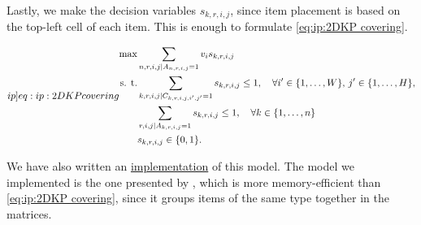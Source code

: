 Lastly, we make the decision variables $s_{k,r,i,j}$, since item placement is based on the top-left cell of each item. This is enough to formulate \cref{eq:ip:2DKP covering}.

\begin{subequations}
    \label[ip]{eq:ip:2DKP covering}
    \begin{align}
        \max &\sum_{n,r,i,j \mid A_{n,r,i,j} = 1} v_i s_{k,r,i,j}\\
        \text{s. t.} &\sum_{k,r,i,j \mid C_{k,r,i,j,i',j'} = 1} s_{k,r,i,j} \leq 1, \quad \forall i' \in \{1,\dots,W\}, \, j' \in \{1,\dots,H\},\\
        &\sum_{r,i,j \mid A_{k,r,i,j} = 1} s_{k,r,i,j} \leq 1, \quad \forall k \in \{1,\dots,n\}\\
        &s_{k,r,i,j} \in \{0,1\}.
    \end{align}
\end{subequations}

We have also written an \href{https://github.com/phcentenaro7/IC-Knapsack/blob/957b87062cb846a6e30e7c0a9246ad8b6f7bd189/Knapsack/Kalvelagen/jump_2dknapsack_covering.jl}{implementation} of this model. The model we implemented is the one presented by \textcite{KALVELAGEN2021}, which is more memory-efficient than \cref{eq:ip:2DKP covering}, since it groups items of the same type together in the matrices.


